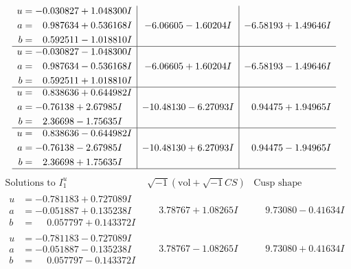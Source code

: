 \documentclass[1p]{elsarticle_modified}
\theoremstyle{definition}
\newcommand{\I}{\sqrt{-1}}
\begin{document}
$$\begin{array}{c|c|c}
\begin{aligned}
u &= -0.030827 + 1.048300 I \\
a &= \phantom{-}0.987634 + 0.536168 I \\
b &= \phantom{-}0.592511 - 1.018810 I\end{aligned}
 & -6.06605 - 1.60204 I & -6.58193 + 1.49646 I \\ \hline\begin{aligned}
u &= -0.030827 - 1.048300 I \\
a &= \phantom{-}0.987634 - 0.536168 I \\
b &= \phantom{-}0.592511 + 1.018810 I\end{aligned}
 & -6.06605 + 1.60204 I & -6.58193 - 1.49646 I \\ \hline\begin{aligned}
u &= \phantom{-}0.838636 + 0.644982 I \\
a &= -0.76138 + 2.67985 I \\
b &= \phantom{-}2.36698 - 1.75635 I\end{aligned}
 & -10.48130 - 6.27093 I & \phantom{-}0.94475 + 1.94965 I \\ \hline\begin{aligned}
u &= \phantom{-}0.838636 - 0.644982 I \\
a &= -0.76138 - 2.67985 I \\
b &= \phantom{-}2.36698 + 1.75635 I\end{aligned}
 & -10.48130 + 6.27093 I & \phantom{-}0.94475 - 1.94965 I\\
 \hline 
 \end{array}$$\newpage$$\begin{array}{c|c|c}  
\text{Solutions to }I^u_{1}& \I (\text{vol} + \sqrt{-1}CS) & \text{Cusp shape}\\
 \hline 
\begin{aligned}
u &= -0.781183 + 0.727089 I \\
a &= -0.051887 + 0.135238 I \\
b &= \phantom{-}0.057797 + 0.143372 I\end{aligned}
 & \phantom{-}3.78767 + 1.08265 I & \phantom{-}9.73080 - 0.41634 I \\ \hline\begin{aligned}
u &= -0.781183 - 0.727089 I \\
a &= -0.051887 - 0.135238 I \\
b &= \phantom{-}0.057797 - 0.143372 I\end{aligned}
 & \phantom{-}3.78767 - 1.08265 I & \phantom{-}9.73080 + 0.41634 I \\ \hline\begin{aligned}

\end{aligned}
\end{array}$$
\end{document}
